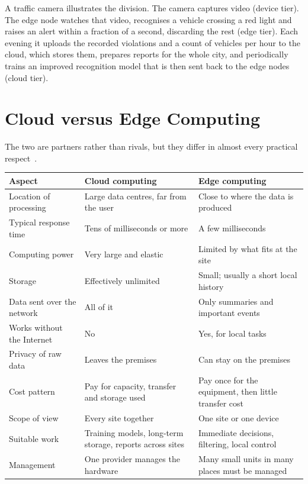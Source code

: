 \documentclass[../main.tex]{subfiles}
\begin{document}
A traffic camera illustrates the division. The camera captures video (device
tier). The edge node watches that video, recognises a vehicle crossing a red
light and raises an alert within a fraction of a second, discarding the rest
(edge tier). Each evening it uploads the recorded violations and a count of
vehicles per hour to the cloud, which stores them, prepares reports for the
whole city, and periodically trains an improved recognition model that is
then sent back to the edge nodes (cloud tier).

\section{Cloud versus Edge Computing}

The two are partners rather than rivals, but they differ in almost every
practical respect~.

\begin{center}
\begin{tabularx}{\textwidth}{@{}p{3.2cm}LL@{}}
\toprule
\textbf{Aspect} & \textbf{Cloud computing} & \textbf{Edge computing} \\
\midrule
Location of processing & Large data centres, far from the user & Close to
  where the data is produced \\
Typical response time & Tens of milliseconds or more & A few milliseconds \\
Computing power & Very large and elastic & Limited by what fits at the site \\
Storage & Effectively unlimited & Small; usually a short local history \\
Data sent over the network & All of it & Only summaries and important
  events \\
Works without the Internet & No & Yes, for local tasks \\
Privacy of raw data & Leaves the premises & Can stay on the premises \\
Cost pattern & Pay for capacity, transfer and storage used & Pay once for the
  equipment, then little transfer cost \\
Scope of view & Every site together & One site or one device \\
Suitable work & Training models, long-term storage, reports across sites &
  Immediate decisions, filtering, local control \\
Management & One provider manages the hardware & Many small units in many
  places must be managed \\
\bottomrule
\end{tabularx}
\end{center}
\end{document}
